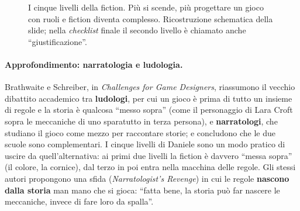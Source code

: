 \begin{figure}[htbp]
\centering
{}
\caption{I cinque livelli della fiction. Più si scende, più progettare un gioco con ruoli e
fiction diventa complesso. Ricostruzione schematica della slide; nella \emph{checklist} finale
il secondo livello è chiamato anche ``giustificazione''.}
\label{a16:fig:livelli}
\end{figure}

\paragraph{Approfondimento: narratologia e ludologia.} Brathwaite e Schreiber, in
\emph{Challenges for Game Designers}, riassumono il vecchio dibattito accademico tra
\textbf{ludologi}, per cui un gioco è prima di tutto un insieme di regole e la storia è qualcosa
``messo sopra'' (come il personaggio di Lara Croft sopra le meccaniche di uno sparatutto in terza
persona), e \textbf{narratologi}, che studiano il gioco come mezzo per raccontare storie; e
concludono che le due scuole sono complementari. I cinque livelli di Daniele sono un modo pratico
di uscire da quell'alternativa: ai primi due livelli la fiction è davvero ``messa sopra'' (il colore,
la cornice), dal terzo in poi entra nella macchina delle regole. Gli stessi autori propongono una
sfida (\emph{Narratologist's Revenge}) in cui le regole \textbf{nascono dalla storia} man mano che
si gioca: ``fatta bene, la storia può far nascere le meccaniche, invece di fare loro da spalla''.

